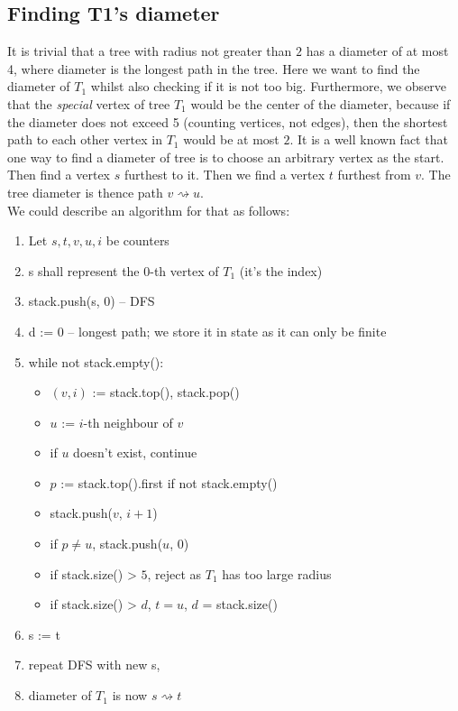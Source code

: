 \documentclass[11pt]{article}
\begin{document}
\subsection{Finding T1's diameter}
It is trivial that a tree with radius not greater than $2$ has a diameter of at
most 4, where diameter is the longest path in the tree. Here we want to find the
diameter of $T_1$ whilst also checking if it is not too big. Furthermore, we
observe that the \emph{special} vertex of tree $T_1$ would be the center of the
diameter, because if the diameter does not exceed 5 (counting vertices, not
edges), then the shortest path to each other vertex in $T_1$ would be at most
$2$. It is a well known fact that one way to find a diameter of tree is to
choose an arbitrary vertex as the start. Then find a vertex $s$ furthest to
it. Then we find a vertex $t$ furthest from $v$. The tree diameter is thence
path $v \rightsquigarrow u$.\\
We could describe an algorithm for that as follows:
\begin{enumerate}
    \item Let $s,t,v,u,i$ be counters
    \item s shall represent the $0$-th vertex of $T_1$ (it's the index)
    \item stack.push(s, 0) -- DFS
    \item d := 0 -- longest path; we store it in state as it can only be finite
    \item while not stack.empty():
        \begin{itemize}
            \item $(v,i)$ := stack.top(), stack.pop()
            \item $u$ := $i$-th neighbour of $v$
            \item if $u$ doesn't exist, continue
            \item $p$ := stack.top().first if not stack.empty()
            \item stack.push($v$, $i+1$)
            \item if $p \neq u$, stack.push($u$, $0$)
            \item if stack.size() > $5$, reject as $T_1$ has too large radius
            \item if stack.size() > $d$, $t = u$, $d$ = stack.size()
        \end{itemize}
    \item s := t
    \item repeat DFS with new s, 
    \item diameter of $T_1$ is now $s \rightsquigarrow t$
\end{enumerate}
\end{document}
